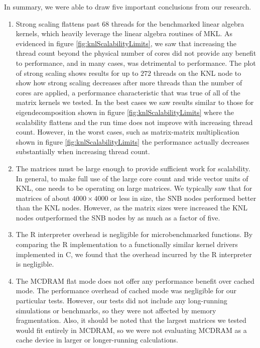 In summary, we were able to draw five important conclusions from our research.
\begin{enumerate}

\item Strong scaling flattens past 68 threads for the benchmarked linear algebra kernels,
which heavily leverage the linear algebra routines of MKL. As evidenced in figure
\ref{fig:knlScalabilityLimits}, we saw that increasing the thread count beyond the
physical number of cores did not provide any benefit to performance, and in many cases,
was detrimental to performance. The plot of strong scaling shows results for up to $272$
threads on the KNL node to show how strong scaling decreases after more threads than the
number of cores are applied, a performance characteristic that was true of all of the
matrix kernels we tested. In the best cases we saw results similar to those for
eigendecomposition shown in figure \ref{fig:knlScalabilityLimits} where the scalability
flattens and the run time does not improve with increasing thread count. However, in the
worst cases, such as matrix-matrix multiplication shown in figure
\ref{fig:knlScalabilityLimits} the performance actually decreases substantially when
increasing thread count.

\item The matrices must be large enough to provide sufficient work for scalability. In
general, to make full use of the large core count and wide vector units of KNL, one needs
to be operating on large matrices. We typically saw that for matrices of about $4000\times
4000$ or less in size, the SNB nodes performed better than the KNL nodes. However, as the
matrix sizes were increased the KNL nodes outperformed the SNB nodes by as much as a
factor of five.

\item The R interpreter overhead is negligible for microbenchmarked functions. By
comparing the R implementation to a functionally similar kernel drivers implemented in C,
we found that the overhead incurred by the R interpreter is negligible.

\item The MCDRAM flat mode does not offer any performance benefit over cached mode. The
performance overhead of cached mode was negligible for our particular tests. However, our
tests did not include any long-running simulations or benchmarks, so they were not
affected by memory fragmentation. Also, it should be noted that the largest matrices we
tested would fit entirely in MCDRAM, so we were not evaluating MCDRAM as a cache device in
larger or longer-running calculations.


\end{enumerate}

